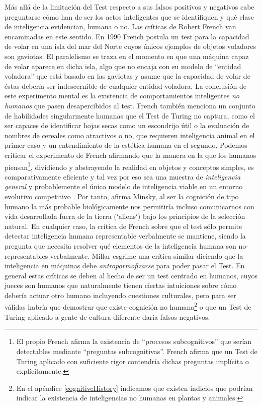 \documentclass[12pt]{memoir}
\begin{document}
Más allá de la limitación del Test respecto a sus falsos positivos y negativos cabe preguntarse cómo han de ser los actos inteligentes que se identifiquen y qué clase de inteligencia evidencian, humana o no. Las críticas de Robert French van encaminadas en este sentido. En 1990 \parencite[apartado 4.5]{afterTuring} French postula un test para la capacidad de volar en una isla del mar del Norte cuyos únicos ejemplos de objetos voladores son gaviotas. El paralelismo se traza en el momento en que una máquina capaz de volar aparece en dicha isla, algo que no encaja con su modelo de ``entidad voladora'' que está basado en las gaviotas y asume que la capacidad de volar de éstas debería ser indescernible de cualquier entidad voladora. La conclusión de este experimento mental es la existencia de comportamientos inteligentes \textit{no humanos} que pasen desapercibidos al test. French también menciona un conjunto de habilidades singularmente humanas que el Test de Turing no captura, como el ser capaces de identificar hojas secas como un escondrijo útil o la evaluación de nombres de cereales como atractivos o no, que requieren inteligencia animal en el primer caso y un entendimiento de la estética humana en el segundo. Podemos criticar el experimento de French afirmando que la manera en la que los humanos piensan\footnote{El propio French afirma la existencia de ``procesos subcognitivos'' que serían detectables mediante ``preguntas subcognitivas''. French afirma que un Test de Turing aplicado con suficiente rigor contendría dichas preguntas implícita o explícitamente.}, dividiendo y abstrayendo la realidad en objetos y conceptos simples, es comparativamente eficiente y tal vez por eso sea una muestra de \textit{inteligencia general} y probablemente el único modelo de inteligencia viable en un entorno evolutivo competitivo \parencite{aliens}. Por tanto, afirma Minsky, al ser la cognición de tipo humano la más probable biológicamente nos permitiría incluso comunicarnos con vida desarrollada fuera de la tierra (`aliens`) bajo los principios de la selección natural. En cualquier caso, la crítica de French sobre que el test sólo permite detectar inteligencia humana representable verbalmente se mantiene, siendo la pregunta que necesita resolver qué elementos de la inteligencia humana son no-representables verbalmente.  Millar esgrime una crítica similar \parencite[apartado 3.3]{afterTuring} diciendo que la inteligencia en máquinas debe \textit{antropormofizarse} para poder pasar el Test. En general estas críticas se deben al hecho de ser un test centrado en humanos, cuyos jueces son humanos que naturalmente tienen ciertas intuiciones sobre cómo debería actuar otro humano incluyendo cuestiones culturales, pero para ser válidas habría que demostrar que existe cognición no humana\footnote{En el apéndice \ref{cognitiveHistory} indicamos que existen indicios que podrían indicar la existencia de inteligencias no humanas en plantas y animales.} o que un Test de Turing aplicado a gente de cultura diferente daría falsos negativos. 
\end{document}
